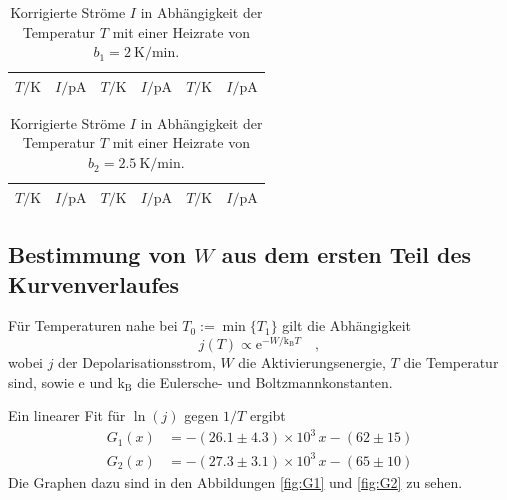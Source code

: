 \begin{table}[htpb]
	\centering
	\begin{tabular}{cc|cc|cc}
		\midrule
		\midrule
		$T / \si{\kelvin}$ &
		$I / \si{\pA}$ &
		$T / \si{\kelvin}$ &
		$I / \si{\pA}$ &
		$T / \si{\kelvin}$ &
		$I / \si{\pA}$ \\
		\midrule
		
		\midrule
		\midrule
	\end{tabular}
	\caption{Korrigierte Ströme $I$ in Abhängigkeit der Temperatur $T$ mit
		einer Heizrate von $b_1 = \SI{2}{\kelvin\per\minute}$.}
	\label{tab:tab1}
\end{table}
%
\begin{table}[htpb]
	\centering
	\begin{tabular}{cc|cc|cc}
		\midrule
		\midrule
		$T / \si{\kelvin}$ &
		$I / \si{\pA}$ &
		$T / \si{\kelvin}$ &
		$I / \si{\pA}$ &
		$T / \si{\kelvin}$ &
		$I / \si{\pA}$ \\
		\midrule
		
		\midrule
		\midrule
	\end{tabular}
	\caption{Korrigierte Ströme $I$ in Abhängigkeit der Temperatur $T$ mit
		einer Heizrate von $b_2 = \SI{2.5}{\kelvin\per\minute}$.}
	\label{tab:tab2}
\end{table}
%
\clearpage
\subsection{Bestimmung von $W$ aus dem ersten Teil des Kurvenverlaufes}
Für Temperaturen nahe bei $T_0:=\min\{T_1\}$ gilt die Abhängigkeit
\begin{equation}
j(T)\propto \text{e}^{-W/\text{k}_\text{B}T} \quad ,
\end{equation}
wobei $j$ der Depolarisationsstrom, $W$ die Aktivierungsenergie, $T$ die
Temperatur sind, sowie $\text{e}$ und $\text{k}_\text{B}$ die Eulersche- und
Boltzmannkonstanten.

Ein linearer Fit für $\ln(j)$ gegen $1/T$ ergibt
%
%
\begin{align}
G_1(x)&= -( 26.1\pm 4.3)\times 10^{3} \,x - (62 \pm 15) \\
G_2(x)&= -(27.3 \pm 3.1 )\times 10^{3} \,x - (65 \pm 10)
\end{align}
Die Graphen dazu sind in den Abbildungen \ref{fig:G1} und \ref{fig:G2} zu sehen.

